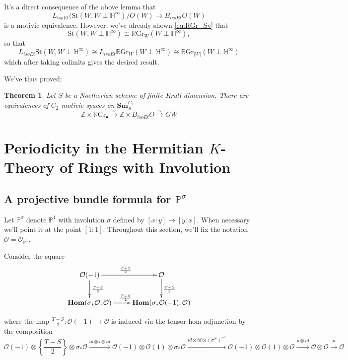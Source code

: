 \documentclass[edeposit,fullpage]{uiucthesis2009}
\newcommand{\Z}{\mathbb Z}
\newcommand{\mbb}{\mathbb}
\newcommand{\mc}{\mathcal}
\newcommand{\RGr}{\mathbb R\mathrm{Gr}}
\newcommand{\Sm}[1]{\mathbf{Sm}_{#1}}
\newcommand{\St}{\mathrm{St}}
\DeclareMathOperator{\iHom}{\mathbf{Hom}}
\theoremstyle{plain}
\numberwithin{lemma}{section}
\newtheorem{theorem}[lemma]{Theorem}
\theoremstyle{definition}
\begin{document}
It's a direct consequence of the above lemma that 
\[
L_{isoEt}(\St(W,W\perp \mbb H^\infty)/O(W)
\rightarrow B_{isoEt}O(W)
\]
is a motivic equivalence. However, we've already shown \eqref{eq:RGr_Sv} that
\[
\St(W,W\perp \mbb H^\infty) \cong \RGr_W(W \perp \mbb H^\infty),
\]
so that 
\[
L_{isoEt}\St(W,W\perp \mbb H^\infty) \cong L_{isoEt}\RGr_W(W \perp
\mbb H^\infty) \cong \RGr_{|W|}(W \perp \mbb H^\infty)
\]
which after taking colimits gives the desired result. 

We've thus proved:

\begin{theorem}\label{thm:RGr_GW_nonreg}
Let $S$ be a Noetherian scheme of finite Krull dimension. There are
equivalences of $C_2$-motivic spaces on $\Sm{S}^{C_2}$
\[
\Z \times \RGr_\bullet \xrightarrow{\sim} \Z \times B_{isoEt}O
\xrightarrow{\sim} GW
\]
\end{theorem}

\chapter{Periodicity in the Hermitian $K$-Theory of Rings with Involution}\label{chap:Einf}

\section{A projective bundle formula for $\mbb P^\sigma$}

Let $\mbb P^\sigma$ denote $\mbb P^1$ with involution $\sigma$ defined
by $[x:y] \mapsto
[y:x]$. When necessary we'll point it at the point $[1:1]$. Throughout this section, we'll fix the notation $\mc O = \mc
O_{\mbb P^1}$.

Consider the square
\begin{equation}\label{diag:prebott}
\xymatrix{\mc O(-1)\ar[r]^{\frac{T+S}{2}}\ar[d]^{\frac{T-S}{2}} & \mc O \ar[d]^{\frac{T-S}{2}} \\ \iHom(\sigma_*\mc
  O,\mc O) \ar[r]^{\frac{T+S}{2}} & \iHom(\sigma_* \mc O(-1),\mc O)}
\end{equation}

where the map $\frac{T-S}{2} : \mc O(-1) \rightarrow \mc
O$ is induced via the tensor-hom adjunction by the composition 
\[
\mc O(-1) \otimes \left\{\frac{T-S}{2}\right\} \otimes \sigma_* \mc O
\xrightarrow{id \otimes i \otimes id}
\mc O(-1) \otimes \mc O(1) \otimes \sigma_*\mc O  
\xrightarrow{id \otimes id \otimes (\sigma^\#)^{-1}} \mc O(-1) \otimes
\mc O(1) \otimes \mc O \xrightarrow{\mu \otimes id} \mc O \otimes \mc
O \xrightarrow{\mu} \mc O
\]
\end{document}
